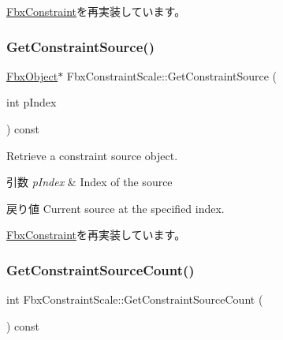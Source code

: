 \hyperlink{class_fbx_constraint_a7f587d5db9685b5ee925a85354263edc}{Fbx\+Constraint}を再実装しています。

\mbox{\label{class_fbx_constraint_scale_ac957fc33cab352ef355602fb4325c5b7}} 
\subsubsection{\texorpdfstring{Get\+Constraint\+Source()}{GetConstraintSource()}}
{\footnotesize\ttfamily \hyperlink{class_fbx_object}{Fbx\+Object}$\ast$ Fbx\+Constraint\+Scale\+::\+Get\+Constraint\+Source (\begin{DoxyParamCaption}\item[{int}]{p\+Index }\end{DoxyParamCaption}) const\hspace{0.3cm}{\ttfamily [virtual]}}

Retrieve a constraint source object. 
\begin{DoxyParams}{引数}
{\em p\+Index} & Index of the source \\
\hline
\end{DoxyParams}
\begin{DoxyReturn}{戻り値}
Current source at the specified index. 
\end{DoxyReturn}


\hyperlink{class_fbx_constraint_a5ff6fe6fc98af1e33e8b297bc1cea007}{Fbx\+Constraint}を再実装しています。

\mbox{\label{class_fbx_constraint_scale_a5c4500706618751078dddca3652ce936}} 
\subsubsection{\texorpdfstring{Get\+Constraint\+Source\+Count()}{GetConstraintSourceCount()}}
{\footnotesize\ttfamily int Fbx\+Constraint\+Scale\+::\+Get\+Constraint\+Source\+Count (\begin{DoxyParamCaption}{ }\end{DoxyParamCaption}) const\hspace{0.3cm}{\ttfamily [virtual]}}

